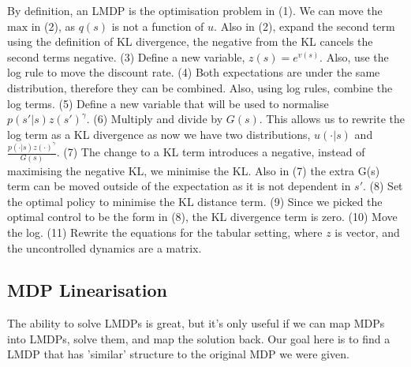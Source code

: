 By definition, an LMDP is the optimisation problem in (1). We can move the $\text{max}$ in (2), as $q(s)$ is not a function of $u$. Also in (2), expand the second term using the definition of KL divergence, the negative from the KL cancels the second terms negative. (3) Define a new variable, $z(s) = e^{v(s)}$. Also, use the log rule to move the discount rate. (4) Both expectations are under the same distribution, therefore they can be combined. Also, using log rules, combine the log terms. (5) Define a new variable that will be used to normalise $p(s' | s)z(s')^{\gamma}$. (6) Multiply and divide by $G(s)$. This allows us to rewrite the log term as a KL divergence as now we have two distributions, $u(\cdot | s)$ and $\frac{p(\cdot | s)z(\cdot)^{\gamma}}{G(s)}$. (7) The change to a KL term introduces a negative, instead of maximising the negative KL, we minimise the KL. Also in (7) the extra G(s) term can be moved outside of the expectation as it is not dependent in $s'$. (8) Set the optimal policy to minimise the KL distance term. (9) Since we picked the optimal control to be the form in (8), the KL divergence term is zero. (10) Move the log. (11) Rewrite the equations for the tabular setting, where $z$ is vector, and the uncontrolled dynamics are a matrix.

\subsection{MDP Linearisation}\label{mdp-Linearisation}

The ability to solve LMDPs is great, but it's only useful if we can map MDPs into LMDPs, solve them, and map the solution back.
Our goal here is to find a LMDP that has 'similar' structure to the original MDP we were given.\footnotemark


